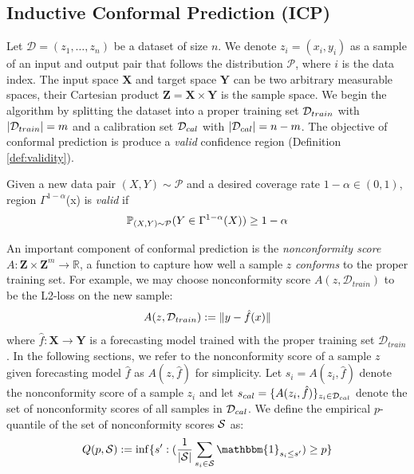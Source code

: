 \subsection{Inductive Conformal Prediction (ICP)}


Let $\mathcal{D} = (z_1, \ldots, z_n)$ be a dataset of size $n$. We denote $z_i = (x_i,y_i)$ as a sample of an input and output pair that follows the distribution $\mathcal{P}$, where $i$ is the data index. The input space $\mathbf{X}$ and target space $ \mathbf{Y}$ can be two arbitrary measurable spaces, their Cartesian product $\mathbf{Z} = \mathbf{X} \times \mathbf{Y}$ is the sample space. We begin the algorithm by splitting the dataset into a proper training set $\mathcal{D}_{train}$ with $|\mathcal{D}_{train}| = m$ and a calibration set $\mathcal{D}_{cal}$ with $|\mathcal{D}_{cal}| = n-m$. The objective of conformal prediction is produce a \textit{valid} confidence region (Definition \ref{def:validity}).  

\begin{definition}[Validity]
Given a new data pair $(X,Y) \sim  \mathcal{P}$ and a desired coverage rate $1-\alpha \in (0,1)$, region $\Gamma^{1-\alpha}$(x) is \textit{valid} if
\[ {\mathbb{P}}_{(X,Y) \sim {\mathcal{P}}} (Y \in \Gamma^{1-\alpha}(X)) \geq 1-\alpha
\]
\label{def:validity} 
\end{definition}


An important component of conformal prediction is the \textit{nonconformity score} $A : \mathbf{Z} \times \mathbf{Z}^m  \rightarrow \mathbb{R}$, a function to capture how well a sample $z$ \textit{conforms} to the proper training set. 
For example, we may choose nonconformity score $A(z, \mathcal{D}_{train})$ to be the L2-loss on the new sample:
\begin{equation}
   A(z, \mathcal{D}_{train}) := \| y - \hat{f}(x) \|
\end{equation}
where $\hat{f}: \mathbf{X}\longrightarrow \mathbf{Y}$ is a forecasting model trained with the proper training set $\mathcal{D}_{train}$. In the following sections, we refer to the nonconformity score of a sample $z$ given forecasting model $\hat{f}$ as $A(z, \hat{f})$ for simplicity. Let $s_i = A(z_i, \hat{f})$ denote the nonconformity score of a sample $z_i$ and let $s_{cal} = \{A(z_i, \hat{f})\}_{z_i \in \mathcal{D}_{cal}}$ denote the set of nonconformity scores of all samples in $\mathcal{D}_{cal}$. We define the empirical $p$-quantile of the set of nonconformity scores ${\mathcal{S}}$ as:
\begin{equation}
    Q(p, \gS) := \inf\{s': (\frac{1}{|\gS|} \sum_{s_i \in \gS} \mathbbm{1}_{s_i \leq s'}) \geq p \}
    \label{eq:quantile}
\end{equation}

